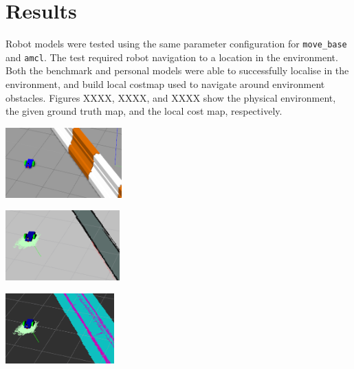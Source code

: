 \documentclass[a4paper]{article}
\begin{document}
\section{Results}
Robot models were tested using the same parameter configuration for \texttt{move\_base} and \texttt{amcl}. The test required robot navigation to a location in the environment. Both the benchmark and personal models were able to successfully localise in the environment, and build local costmap used to navigate around environment obstacles. Figures XXXX, XXXX, and XXXX show the physical environment, the given ground truth map, and the local cost map, respectively.\\

\begin{minipage}{0.3\textwidth}
\centering
\includegraphics[height=2.7cm]{cost_map_1}
\end{minipage}
\hspace{0.5cm}
\begin{minipage}{0.3\textwidth}
\centering
\includegraphics[height=2.7cm]{cost_map_2}
\end{minipage}
\hspace{0.5cm}
\begin{minipage}{0.3\textwidth}
\centering
\includegraphics[height=2.7cm]{cost_map_3}
\end{minipage}
\end{document}
